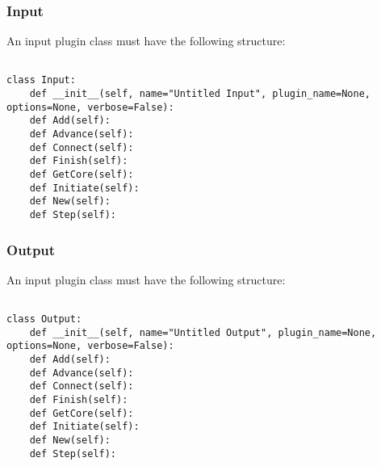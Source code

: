 \documentclass[12pt]{article}
\begin{document}
\subsubsection*{Input}

An input plugin class must have the following structure:

\begin{verbatim}

class Input:
    def __init__(self, name="Untitled Input", plugin_name=None, options=None, verbose=False):
    def Add(self):
    def Advance(self):
    def Connect(self):
    def Finish(self):
    def GetCore(self):
    def Initiate(self):
    def New(self):
    def Step(self):
\end{verbatim}


\subsubsection*{Output}

An input plugin class must have the following structure:

\begin{verbatim}

class Output:
    def __init__(self, name="Untitled Output", plugin_name=None, options=None, verbose=False):
    def Add(self):
    def Advance(self):
    def Connect(self):
    def Finish(self):
    def GetCore(self):
    def Initiate(self):
    def New(self):
    def Step(self):
\end{verbatim}




\subsection*{}
\end{document}
